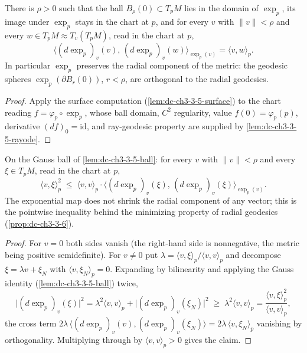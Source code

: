 \begin{lemma}
  \label{lem:dc-ch3-3-5-ball}


  There is $\rho > 0$ such that the ball $B_\rho(0) \subset T_pM$ lies in the
  domain of $\exp_p$, its image under $\exp_p$ stays in the chart at $p$, and
  for every $v$ with $\|v\| < \rho$ and every
  $w \in T_pM \approx T_v(T_pM)$, read in the chart at $p$,
  $$\big\langle (d\exp_p)_v(v),\, (d\exp_p)_v(w) \big\rangle_{\exp_p(v)}
    = \langle v, w\rangle_p.$$
  In particular $\exp_p$ preserves the radial component of the metric: the
  geodesic spheres $\exp_p(\partial B_r(0))$, $r < \rho$, are orthogonal to
  the radial geodesics.
\end{lemma}
\begin{proof}
  \sketch

  Apply the surface computation (\cref{lem:dc-ch3-3-5-surface}) to the chart
  reading $f = \varphi_p \circ \exp_p$, whose ball domain, $C^2$ regularity,
  value $f(0)=\varphi_p(p)$, derivative $(df)_0 = \mathrm{id}$, and
  ray-geodesic property are supplied by \cref{lem:dc-ch3-3-5-rayode}.

\end{proof}

\begin{lemma}
  \label{lem:dc-ch3-3-5-radial}


  On the Gauss ball of \cref{lem:dc-ch3-3-5-ball}: for every $v$ with
  $\|v\| < \rho$ and every $\xi \in T_pM$, read in the chart at $p$,
  $$\langle v, \xi\rangle_p^2
    \;\le\; \langle v, v\rangle_p \cdot
      \big\langle (d\exp_p)_v(\xi),\, (d\exp_p)_v(\xi)\big\rangle_{\exp_p(v)}.$$
  The exponential map does not shrink the radial component of any vector;
  this is the pointwise inequality behind the minimizing property of radial
  geodesics (\cref{prop:dc-ch3-3-6}).
\end{lemma}
\begin{proof}
  \sketch

  For $v = 0$ both sides vanish (the right-hand side is nonnegative, the
  metric being positive semidefinite). For $v \ne 0$ put
  $\lambda = \langle v,\xi\rangle_p / \langle v,v\rangle_p$ and decompose
  $\xi = \lambda v + \xi_N$ with $\langle v, \xi_N\rangle_p = 0$. Expanding by
  bilinearity and applying the Gauss identity (\cref{lem:dc-ch3-3-5-ball})
  twice,
  $$\big|(d\exp_p)_v(\xi)\big|^2
    = \lambda^2 \langle v,v\rangle_p
      + \big|(d\exp_p)_v(\xi_N)\big|^2
    \;\ge\; \lambda^2 \langle v,v\rangle_p
    = \frac{\langle v,\xi\rangle_p^2}{\langle v,v\rangle_p},$$
  the cross term $2\lambda\,\langle (d\exp_p)_v(v), (d\exp_p)_v(\xi_N)\rangle
  = 2\lambda\,\langle v, \xi_N\rangle_p$ vanishing by orthogonality.
  Multiplying through by $\langle v,v\rangle_p > 0$ gives the claim.

\end{proof}

